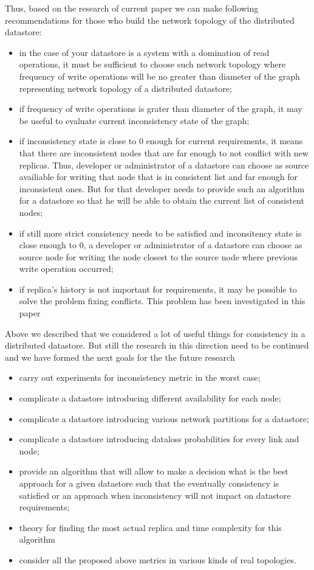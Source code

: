 \documentclass[a4paper,14pt]{llncs}
\begin{document}
Thus, based on the research of current paper we can make following recommendations for those who build the network topology of the distributed datastore:
\begin{itemize}
\item in the case of your datastore is a system with a domination of read operations, it must be sufficient to choose such network topology where frequency of write operations will be no greater than diameter of the graph representing network topology of a distributed datastore;
\item if frequency of write operations is grater than diameter of the graph, it may be useful to evaluate current inconsistency state of the graph;
\item if inconsistency state is close to 0 enough for current requirements, it means that there are inconsistent nodes that are far enough to not conflict with new replicas. Thus, developer or administrator of a datastore  can choose as source availiable for writing that node that is in consistent list and far enough for inconsistent ones. But for that developer needs to provide such an algorithm for a datastore so that he will be able to obtain the current list of consistent nodes;
\item if still more strict consistency needs to be satisfied and inconsitency state is close enough to 0, a developer or administrator of a datastore can choose as source node for writing the node closest to the source node where previous write operation occurred;
\item if replica's history is not important for requirements, it may be possible to solve the problem fixing conflicts. This problem has been investigated in this paper \cite{bib:c_ts}
\end{itemize}
Above we described that we considered a lot of useful things for consistency in a distributed datastore. But still the research in this direction need to be continued and we have formed the next goals for the the future research
\begin{itemize}
\item carry out experiments for inconsistency metric in the worst case;
\item complicate a datastore introducing different availability for each node;
\item complicate a datastore introducing various network partitions for a datastore;
\item complicate a datastore introducing dataloss probabilities for every link and node;
\item provide an algorithm that will allow to make a decision what is the best approach for a given datastore such that the eventually consistency is satisfied or an approach when inconsistency will not impact on datastore requirements;
\item theory for finding the most actual replica and time complexity for this algorithm
\item consider all the proposed above metrics in various kinds of real topologies.
\end{itemize}
\end{document}
